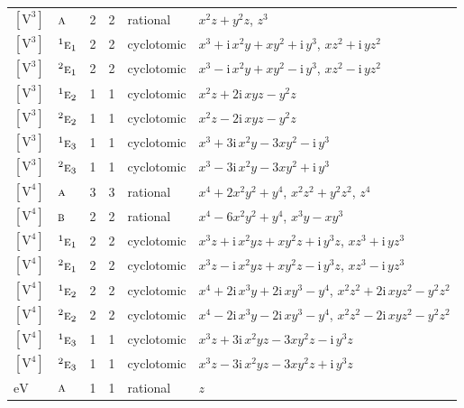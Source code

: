 \documentclass[10pt,a4paper]{article}
\numberwithin{equation}{section}
\newcommand{\irr}[1]{\text{\normalfont\scshape #1}}
\newcommand{\conjpair}[1]{{}^{#1}}
\newcommand{\iunit}{\mathrm{i}}
\newcommand{\jahn}[1]{\mathrm{#1}}
\newlength{\fillwidth}\newlength{\cellwidth}\newlength{\colwidth}
\begin{document}
{\begin{longtable}{@{}llrrl>{\RaggedRight\arraybackslash}p{\fillwidth}@{}}
$\jahn{[V^{3}]}$ & $\irr{a}$ & 2 & 2 & rational & $x^{2}z + y^{2}z$, $z^{3}$\\
$\jahn{[V^{3}]}$ & $\conjpair{1}\irr{e}_{1}$ & 2 & 2 & cyclotomic & $x^{3} + \iunit{}\,x^{2}y + xy^{2} + \iunit{}\,y^{3}$, $xz^{2} + \iunit{}\,yz^{2}$\\
$\jahn{[V^{3}]}$ & $\conjpair{2}\irr{e}_{1}$ & 2 & 2 & cyclotomic & $x^{3} - \iunit{}\,x^{2}y + xy^{2} - \iunit{}\,y^{3}$, $xz^{2} - \iunit{}\,yz^{2}$\\
$\jahn{[V^{3}]}$ & $\conjpair{1}\irr{e}_{2}$ & 1 & 1 & cyclotomic & $x^{2}z + 2\iunit{}\,xyz - y^{2}z$\\
$\jahn{[V^{3}]}$ & $\conjpair{2}\irr{e}_{2}$ & 1 & 1 & cyclotomic & $x^{2}z - 2\iunit{}\,xyz - y^{2}z$\\
$\jahn{[V^{3}]}$ & $\conjpair{1}\irr{e}_{3}$ & 1 & 1 & cyclotomic & $x^{3} + 3\iunit{}\,x^{2}y - 3xy^{2} - \iunit{}\,y^{3}$\\
$\jahn{[V^{3}]}$ & $\conjpair{2}\irr{e}_{3}$ & 1 & 1 & cyclotomic & $x^{3} - 3\iunit{}\,x^{2}y - 3xy^{2} + \iunit{}\,y^{3}$\\
$\jahn{[V^{4}]}$ & $\irr{a}$ & 3 & 3 & rational & $x^{4} + 2x^{2}y^{2} + y^{4}$, $x^{2}z^{2} + y^{2}z^{2}$, $z^{4}$\\
$\jahn{[V^{4}]}$ & $\irr{b}$ & 2 & 2 & rational & $x^{4} - 6x^{2}y^{2} + y^{4}$, $x^{3}y - xy^{3}$\\
$\jahn{[V^{4}]}$ & $\conjpair{1}\irr{e}_{1}$ & 2 & 2 & cyclotomic & $x^{3}z + \iunit{}\,x^{2}yz + xy^{2}z + \iunit{}\,y^{3}z$, $xz^{3} + \iunit{}\,yz^{3}$\\
$\jahn{[V^{4}]}$ & $\conjpair{2}\irr{e}_{1}$ & 2 & 2 & cyclotomic & $x^{3}z - \iunit{}\,x^{2}yz + xy^{2}z - \iunit{}\,y^{3}z$, $xz^{3} - \iunit{}\,yz^{3}$\\
$\jahn{[V^{4}]}$ & $\conjpair{1}\irr{e}_{2}$ & 2 & 2 & cyclotomic & $x^{4} + 2\iunit{}\,x^{3}y + 2\iunit{}\,xy^{3} - y^{4}$, $x^{2}z^{2} + 2\iunit{}\,xyz^{2} - y^{2}z^{2}$\\
$\jahn{[V^{4}]}$ & $\conjpair{2}\irr{e}_{2}$ & 2 & 2 & cyclotomic & $x^{4} - 2\iunit{}\,x^{3}y - 2\iunit{}\,xy^{3} - y^{4}$, $x^{2}z^{2} - 2\iunit{}\,xyz^{2} - y^{2}z^{2}$\\
$\jahn{[V^{4}]}$ & $\conjpair{1}\irr{e}_{3}$ & 1 & 1 & cyclotomic & $x^{3}z + 3\iunit{}\,x^{2}yz - 3xy^{2}z - \iunit{}\,y^{3}z$\\
$\jahn{[V^{4}]}$ & $\conjpair{2}\irr{e}_{3}$ & 1 & 1 & cyclotomic & $x^{3}z - 3\iunit{}\,x^{2}yz - 3xy^{2}z + \iunit{}\,y^{3}z$\\
$\jahn{eV}$ & $\irr{a}$ & 1 & 1 & rational & $z$\\

\end{longtable}}
\end{document}
